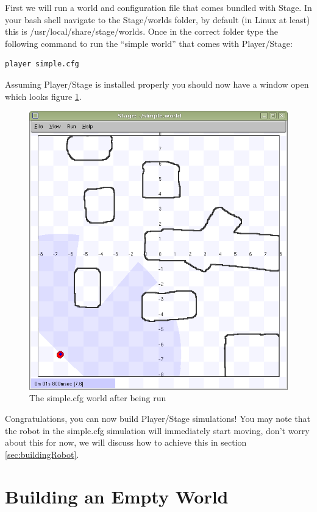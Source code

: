 \documentclass[a4paper]{report}
\newcommand{\plst}{Player/Stage\xspace}
\begin{document}
First we will run a world and configuration file that comes bundled with Stage. In your bash shell navigate to the Stage/worlds folder, by default (in Linux at least) this is /usr/local/share/stage/worlds. Once in the correct folder type the following command to run the ``simple world'' that comes with \plst:
\begin{verbatim}
player simple.cfg
\end{verbatim}
Assuming \plst is installed properly you should now have a window open which looks figure \ref{fig:simpleworldpic}.
\begin{figure}
	\centering
	\includegraphics[width=0.8\linewidth]{./pics/simpleworld.png}
	\caption{The simple.cfg world after being run}
	\label{fig:simpleworldpic}
\end{figure}

Congratulations, you can now build Player/Stage simulations! You may note that the robot in the simple.cfg simulation will immediately start moving, don't worry about this for now, we will discuss how to achieve this in section \ref{sec:buildingRobot}.


\section{Building an Empty World} \label{sec:emptyWorld}
\end{document}

